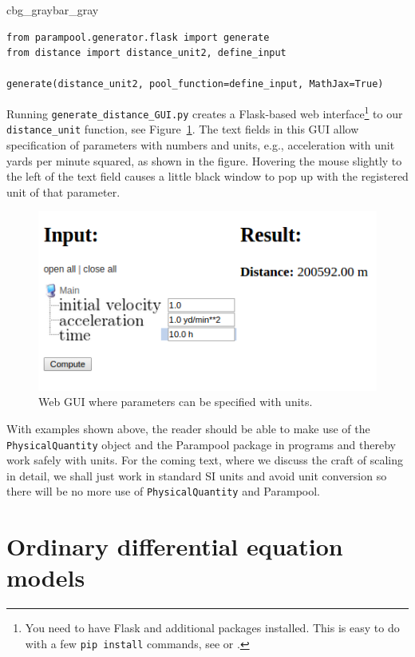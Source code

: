 \documentclass[graybox,envcountchap,sectrefs,final]{svmonodo}
\newenvironment{_pro_tight}[2]{
   \def\FrameCommand{\color{#2}\vrule width 1mm\normalcolor\colorbox{#1}}
   \FrameRule0.6pt\MakeFramed {\advance\hsize-2mm\FrameRestore}\vskip3mm}
   {\vskip0mm\endMakeFramed}
\newenvironment{pro}[2]{
\bgroup\rmfamily
\fboxsep=0mm\relax
\begin{_pro_tight}{#1}{#2}
\list{}{\parsep=-2mm\parskip=0mm\topsep=0pt\leftmargin=2mm
\rightmargin=2\leftmargin\leftmargin=4pt\relax}
\item\relax}
{\endlist\end{_pro_tight}\egroup}
\begin{document}
\begin{pro}{cbg_gray}{bar_gray}\begin{Verbatim}[numbers=none,fontsize=\fontsize{9pt}{9pt},baselinestretch=0.95,xleftmargin=2mm]
from parampool.generator.flask import generate
from distance import distance_unit2, define_input

generate(distance_unit2, pool_function=define_input, MathJax=True)
\end{Verbatim}
\end{pro}
\noindent
Running \Verb!generate_distance_GUI.py! creates a Flask-based web
interface\footnote{You need to have Flask and additional packages installed. This is easy to do with a few \texttt{pip install} commands, see \cite{parampool} or \cite{web4sciapps}.}
to our \Verb!distance_unit! function, see Figure~\ref{scale:dimunit:fig:GUI}.
The text fields in this GUI allow specification of parameters with
numbers and units, e.g., acceleration with unit yards per minute squared,
as shown in the figure. Hovering the mouse slightly to the left of
the text field causes a little black window to pop up with the registered unit
of that parameter.





\begin{figure}[!ht]  %
  \centerline{\includegraphics[width=0.5\linewidth]{fig-scaling/distance_GUI.png}}
  \caption{
  Web GUI where parameters can be specified with units. \label{scale:dimunit:fig:GUI}
  }
\end{figure}


With examples shown above, the reader should be able to make use of the
\texttt{PhysicalQuantity} object and the Parampool package in programs
and thereby work safely with units. For the coming text, where we discuss the
craft of scaling in detail, we shall just work in standard SI units
and avoid unit conversion so there will be no more use of
\texttt{PhysicalQuantity} and Parampool.


\chapter{Ordinary differential equation models}
\end{document}
